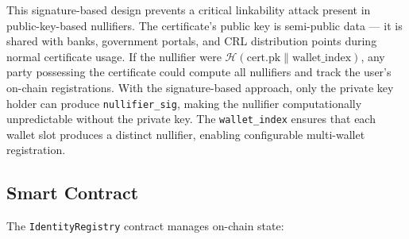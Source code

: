 \documentclass[11pt, a4paper]{article}
\begin{document}
This signature-based design prevents a critical linkability attack
present in public-key-based nullifiers. The certificate's public key is
semi-public data --- it is shared with banks, government portals, and
CRL distribution points during normal certificate usage. If the
nullifier were \(\mathcal{H}(\text{cert.pk} \| \text{wallet\_index})\),
any party possessing the certificate could compute all nullifiers and
track the user's on-chain registrations. With the signature-based
approach, only the private key holder can produce
\texttt{nullifier\_sig}, making the nullifier computationally
unpredictable without the private key. The \texttt{wallet\_index}
ensures that each wallet slot produces a distinct nullifier, enabling
configurable multi-wallet registration.

\subsection{Smart Contract}\label{smart-contract}

The \texttt{IdentityRegistry} contract manages on-chain state:
\end{document}
